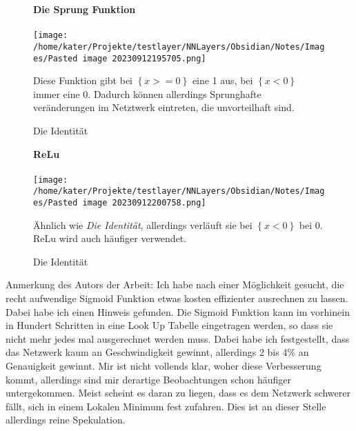 \documentclass[12pt]{article}
\begin{document}
\begin{figure}[H]
\textbf{Die Sprung Funktion}\\\\
\centering
\texttt{[image: /home/kater/Projekte/testlayer/NNLayers/Obsidian/Notes/Images/Pasted image 20230912195705.png]}
\caption{Die Identität}
\label{Was kommt hier rein?}

Diese Funktion gibt bei \(\left\{ x>=0 \right\}\) eine 1 aus, bei \(\left\{ {x<0} \right\}\)  immer eine 0.
Dadurch können allerdings Sprunghafte veränderungen im Netztwerk eintreten, die unvorteilhaft sind.

\end{figure}

\begin{figure}[H]
\textbf{ReLu}\\\\
\centering
\texttt{[image: /home/kater/Projekte/testlayer/NNLayers/Obsidian/Notes/Images/Pasted image 20230912200758.png]}
\caption{Die Identität}
\label{Was kommt hier rein?}

Ähnlich wie \emph{Die Identität}, allerdings verläuft sie bei \(\left\{ {x<0} \right\}\) bei 0.
ReLu wird auch häufiger verwendet.

\end{figure}

Anmerkung des Autors der Arbeit: Ich habe nach einer Möglichkeit gesucht, die recht aufwendige Sigmoid Funktion etwas kosten effizienter ausrechnen zu lassen. Dabei habe ich einen Hinweis gefunden. Die Sigmoid Funktion kann im vorhinein in Hundert Schritten in eine Look Up Tabelle eingetragen werden, so dass sie nicht mehr jedes mal ausgerechnet werden muss. Dabei habe ich festgestellt, dass das Netzwerk kaum an Geschwindigkeit gewinnt, allerdings 2 bis 4\% an Genauigkeit gewinnt. Mir ist nicht vollends klar, woher diese Verbesserung kommt, allerdings sind mir derartige Beobachtungen schon häufiger untergekommen. Meist scheint es daran zu liegen, dass es dem Netzwerk schwerer fällt, sich in einem Lokalen Minimum fest zufahren. Dies ist an dieser Stelle allerdings reine Spekulation.
\end{document}
